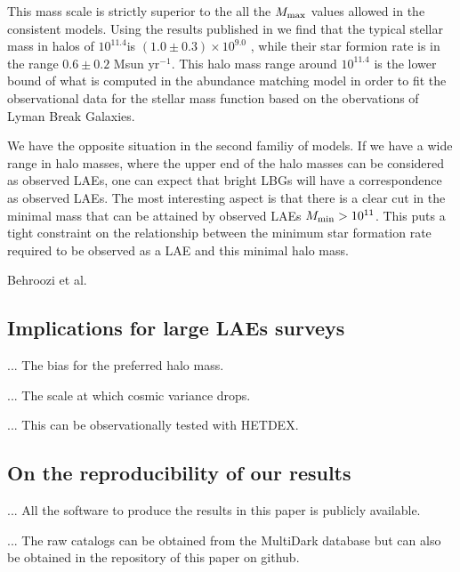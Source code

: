 \documentclass[usenatbib]{mn2e}
\newcommand{\hMsun}{{\ifmmode{h^{-1}{\rm
        {M_{\odot}}}}\else{$h^{-1}{\rm{M_{\odot}}}$}\fi}}
\begin{document}
This mass scale is strictly superior to the all the $M_{\rm max}$
values allowed in the consistent models. Using the results published
in \cite{Behroozi2013a} we find that the typical stellar mass in halos
of $10^{11.4}$\hMsun is $(1.0\pm0.3)\times 10^{9.0}$ \hMsun, while
their star formion rate is in the range $0.6\pm 0.2$ Msun
yr$^{-1}$.  This halo mass range around $10^{11.4}$ \hMsun is the
lower bound of what is computed in the abundance matching model in
order to fit the observational data for the stellar mass function
based on the obervations of Lyman Break Galaxies.

We have the opposite situation in the second familiy of models. If
we have a wide range in halo masses, where the upper end of the halo
masses can be considered as observed LAEs, one can expect that bright
LBGs will have a correspondence as observed LAEs. The most interesting
aspect is that there is a clear cut in the minimal mass that can be
attained by observed LAEs $M_{\rm min}> 10^{11}$\hMsun. This puts a tight
constraint on the relationship between the minimum star formation rate
required to be observed as a LAE and this minimal halo mass.





Behroozi et al.

\subsection{Implications for large LAEs surveys}

... The bias for the preferred halo mass.

... The scale at which cosmic variance drops.

... This can be observationally tested with HETDEX.

\subsection{On the reproducibility of our results}

... All the software to produce the results in this paper is publicly
available. 

... The raw catalogs can be obtained from the MultiDark database but
can also be obtained in the repository of this paper on github.
\end{document}
